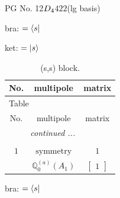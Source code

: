 \documentclass[fleqn,8pt,landscape]{jsarticle}
\begin{document}
\setcounter{MaxMatrixCols}{32}

\renewcommand{\tablename}{Table~}
\renewcommand{\figurename}{Figure~}
\begin{center}
\LARGE
PG No. 12\quad$D_{\rm 4}$\quad$422$\quad[ tetragonal ] (lg basis)
\end{center}
bra: $=\bra{s}$

\noindent
ket: $=\ket{s}$
\renewcommand{\arraystretch}{1.6}
\begin{longtable}{ccc}
\caption{(s,s) block.}
 \\
 \hline \hline
No. & multipole & matrix \\ \hline \endfirsthead

\multicolumn{2}{l}{\tablename\ \thetable{}} \\
 \hline \hline
No. & multipole & matrix \\ \hline \endhead

 \hline \hline
\multicolumn{2}{r}{\footnotesize\it continued ...} \\ \endfoot

 \hline \hline
\multicolumn{2}{r}{} \\ \endlastfoot

$ 1 $ & $ \text{symmetry} $ & $ 1 $ \\
$  $ & $ \mathbb{Q}_{0}^{(a)}(A_{1}) $ & $ \begin{bmatrix} 1 \end{bmatrix} $ \\ \hline
\end{longtable}
bra: $=\bra{s}$
\end{document}
